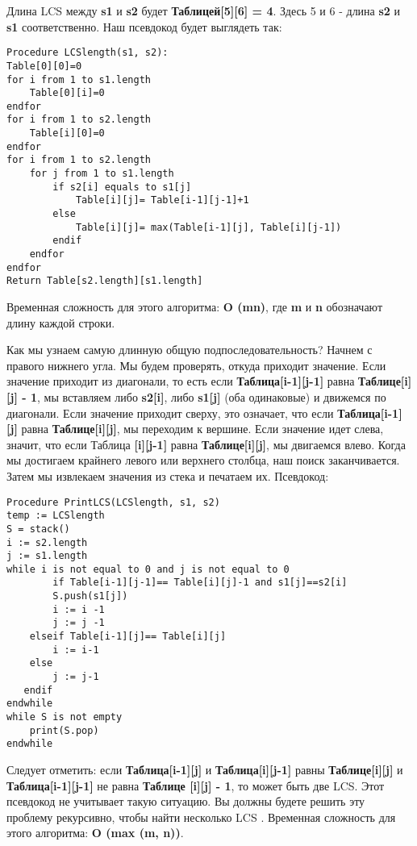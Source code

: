 \vspace{\baselineskip}
Длина LCS между \textbf{s1} и \textbf{s2} будет \textbf{Таблицей[5][6] = 4}. Здесь 5 и 6 - длина \textbf{s2} и \textbf{s1}
соответственно. Наш псевдокод будет выглядеть так:
\vspace{\baselineskip}
\begin{tcolorbox}
\begin{verbatim}
Procedure LCSlength(s1, s2):
Table[0][0]=0
for i from 1 to s1.length
	Table[0][i]=0
endfor
for i from 1 to s2.length
	Table[i][0]=0
endfor
for i from 1 to s2.length
	for j from 1 to s1.length
		if s2[i] equals to s1[j]
			Table[i][j]= Table[i-1][j-1]+1
		else
			Table[i][j]= max(Table[i-1][j], Table[i][j-1])
		endif
	endfor
endfor
Return Table[s2.length][s1.length]
\end{verbatim}
\end{tcolorbox}
\vspace{\baselineskip}
Временная сложность для этого алгоритма: \textbf{O (mn)}, где \textbf{m} и \textbf{n} обозначают
длину каждой строки.
\vspace{\baselineskip}

Как мы узнаем самую длинную общую подпоследовательность? Начнем с
правого нижнего угла. Мы будем проверять, откуда приходит значение. Если
значение приходит из диагонали, то есть если \textbf{Таблица[i-1][j-1]} равна
\textbf{Таблице[i][j] - 1}, мы вставляем либо \textbf{s2[i]}, либо \textbf{s1[j]} (оба одинаковые) и
движемся по диагонали. Если значение приходит сверху, это означает, что
если \textbf{Таблица[i-1][j]} равна \textbf{Таблице[i][j]}, мы переходим к вершине. Если значение
идет слева, значит, что если Таблица \textbf{[i][j-1]} равна \textbf{Таблице[i][j]}, мы
двигаемся влево. Когда мы достигаем крайнего левого или верхнего столбца,
наш поиск заканчивается. Затем мы извлекаем значения из стека и печатаем
их. Псевдокод:
\vspace{\baselineskip}
\begin{tcolorbox}
\begin{verbatim}
Procedure PrintLCS(LCSlength, s1, s2)
temp := LCSlength
S = stack()
i := s2.length
j := s1.length
while i is not equal to 0 and j is not equal to 0
		if Table[i-1][j-1]== Table[i][j]-1 and s1[j]==s2[i]
		S.push(s1[j]) 
		i := i -1		
		j := j -1
	elseif Table[i-1][j]== Table[i][j]
		i := i-1
	else
		j := j-1
   endif
endwhile
while S is not empty
	print(S.pop)
endwhile
\end{verbatim}
\end{tcolorbox}
\vspace{\baselineskip}
Следует отметить: если \textbf{Таблица[i-1][j]} и \textbf{Таблица[i][j-1]} равны \textbf{Таблице[i][j]}
и \textbf{Таблица[i-1][j-1]} не равна \textbf{Таблице [i][j] - 1}, то может быть две LCS. Этот
псевдокод не учитывает такую ситуацию. Вы должны будете решить эту
проблему рекурсивно, чтобы найти несколько LCS
\vspace{\baselineskip}
.
Временная сложность для этого алгоритма: \textbf{O (max (m, n))}.

